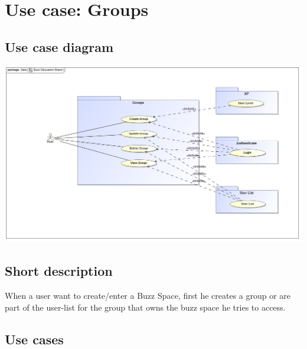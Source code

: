 \documentclass[10pt]{article}
\begin{document}
\section{Use case: Groups}
	\subsection{Use case diagram}
\includegraphics[width=\textwidth]{groups}
	\subsection{Short description}
	\begin{description}
		\item When a user want to create/enter a Buzz Space, first he creates a group or are part of the user-list for the group that owns the buzz space he tries to access. 
	\end{description}
	\subsection{Use cases}
\end{document}
